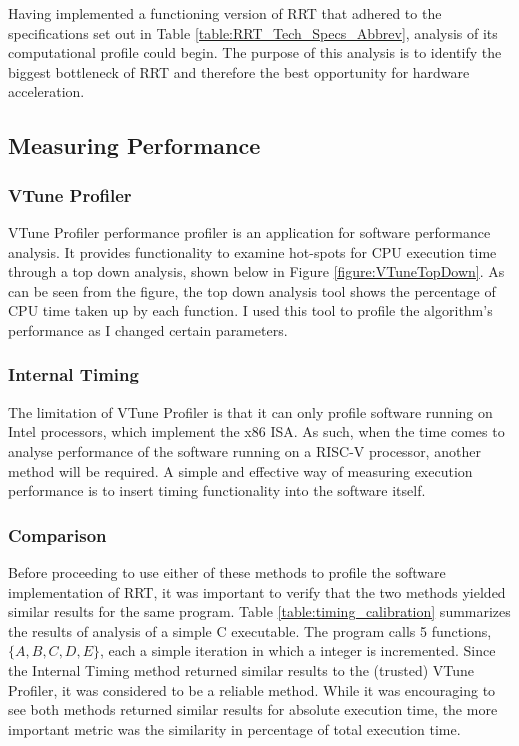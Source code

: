 
Having implemented a functioning version of \gls{RRT} that adhered to the specifications set out in Table \ref{table:RRT_Tech_Specs_Abbrev}, analysis of its computational profile could begin. The purpose of this analysis is to identify the biggest bottleneck of \gls{RRT} and therefore the best opportunity for hardware acceleration.{}

\subsection{Measuring Performance}

    \subsubsection*{VTune Profiler}
    \label{subsubsection:vtune}
        VTune Profiler performance profiler is an application for software performance analysis. It provides functionality to examine hot-spots for CPU execution time through a top down analysis, shown below in Figure \ref{figure:VTuneTopDown}. As can be seen from the figure, the top down analysis tool shows the percentage of CPU time taken up by each function. I used this tool to profile the algorithm's performance as I changed certain parameters.
        

    \subsubsection*{Internal Timing}
        The limitation of VTune Profiler is that it can only profile software running on Intel processors, which implement the x86 \gls{ISA}. As such, when the time comes to analyse performance of the software running on a RISC-V processor, another method will be required. A simple and effective way of measuring execution performance is to insert timing functionality into the software itself. \\


    \subsubsection*{Comparison}
        Before proceeding to use either of these methods to profile the software implementation of \gls{RRT}, it was important to verify that the two methods yielded similar results for the same program. Table \ref{table:timing_calibration} summarizes the results of analysis of a simple C executable. The program calls 5 functions, $\{A, B, C, D, E\}$, each a simple iteration in which a integer is incremented. Since the Internal Timing method returned similar results to the (trusted) VTune Profiler, it was considered to be a reliable method. While it was encouraging to see both methods returned similar results for absolute execution time, the more important metric was the similarity in percentage of total execution time.

